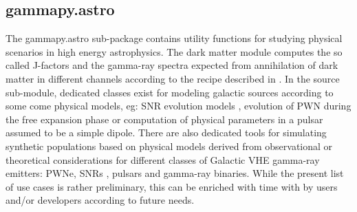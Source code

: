 \subsection{gammapy.astro}
\label{ssec:gammapy-astro}

The gammapy.astro sub-package contains utility functions for studying physical scenarios
in high energy astrophysics. The dark matter module computes the so called J-factors and
the gamma-ray spectra expected from annihilation of dark matter in different channels
according to the recipe described in \cite{2011JCAP...03..051C}. In the source sub-module,
dedicated classes exist for modeling galactic sources according to some come physical models,
eg: SNR evolution models \citep{1950RSPSA.201..159T, 1999ApJS..120..299T}, evolution of
PWN during the free expansion phase \citep{2006ARA&A..44...17G} or computation of
physical parameters in a pulsar assumed to be a simple dipole. There are also dedicated tools
for simulating synthetic populations based on physical models derived from observational or
theoretical considerations for different classes of Galactic VHE gamma-ray emitters:
PWNe, SNRs \cite{1998ApJ...504..761C}, pulsars \cite{2006ApJ...643..332F, 2006MNRAS.372..777L, 2004A&A...422..545Y} and gamma-ray binaries. While the present list of use cases is rather preliminary, this can be enriched with time with by users and/or developers according to future needs.